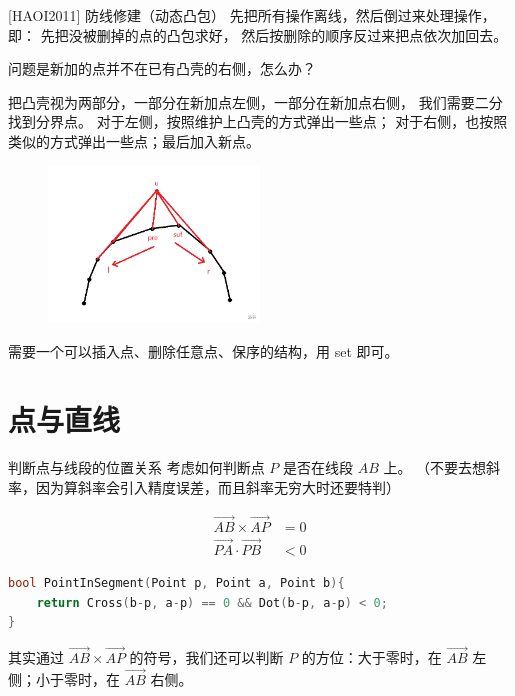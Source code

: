 \documentclass{beamer}
\begin{document}
\begin{frame}{[HAOI2011] 防线修建（动态凸包）}
    \footnotesize
    先把所有操作离线，然后倒过来处理操作，即：
    先把没被删掉的点的凸包求好，
    然后按删除的顺序反过来把点依次加回去。

    \pause\vspace{.5em}
    问题是新加的点并不在已有凸壳的右侧，怎么办？

    \pause\vspace{.5em}
    把凸壳视为两部分，一部分在新加点左侧，一部分在新加点右侧，
    我们需要二分找到分界点。
    \pause 对于左侧，按照维护上凸壳的方式弹出一些点；
    对于右侧，也按照类似的方式弹出一些点；最后加入新点。

    \begin{figure}[H]
        \centering
        \includegraphics[width=0.5\textwidth]{pic/haoi2011.png}
    \end{figure}

    \pause 需要一个可以插入点、删除任意点、保序的结构，用 set 即可。

\end{frame}

\section{点与直线}

\begin{frame}[fragile]{判断点与线段的位置关系}
    \small
    考虑如何判断点 $P$ 是否在线段 $AB$ 上。
    （不要去想斜率，因为算斜率会引入精度误差，而且斜率无穷大时还要特判）

    \vspace{1em}\pause
    \begin{align}
        \overrightarrow{AB}\times  \overrightarrow{AP}&=0\\
        \overrightarrow{PA}\cdot  \overrightarrow{PB}&<0
    \end{align}

    \vspace{1em}\pause
    \begin{lstlisting}[language=c++]
bool PointInSegment(Point p, Point a, Point b){
    return Cross(b-p, a-p) == 0 && Dot(b-p, a-p) < 0;
}
    \end{lstlisting}

    \vspace{1em}\pause
    其实通过 $\overrightarrow{AB}\times  \overrightarrow{AP}$
    的符号，我们还可以判断 $P$ 的方位：大于零时，在 $\overrightarrow{AB}$
    左侧；小于零时，在 $\overrightarrow{AB}$ 右侧。
\end{frame}
\end{document}
